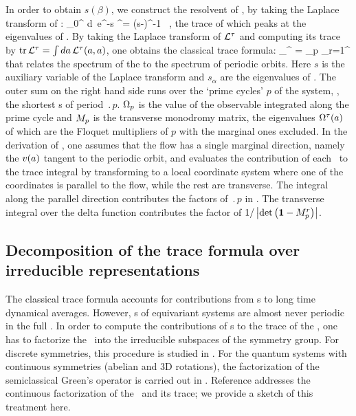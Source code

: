 In order to obtain $s(\beta)$, we construct the resolvent of \Aop , by taking
the Laplace transform of :
\beq
   \int_0^{\infty} \!d\zeit\, e^{-s\zeit} \Lop^\zeit = (s-\Aop)^{-1} \, ,
   \label{eq-ResolventA}
\eeq
the trace of which peaks at the eigenvalues of \Aop. By taking the
Laplace transform of ${\cal L}^{\tau}$ and computing its trace
by $\mbox{\rm tr}\, {\cal L}^{\tau} = \int da \, {\cal L}^{\tau} (a,a)$, one obtains the
classical trace formula:
\beq
\sum_{}^{\infty}  = \sum_p 
\sum_{r=1}^{\infty} 
that relates the spectrum of the {\evOper} to the spectrum of periodic
orbits. Here  $s$ is the auxiliary
variable of the Laplace transform and $s_{\alpha}$ are the eigenvalues of \Aop . The
outer sum on the right hand side runs over the `prime cycles' $p$ of the system,
\ie, the shortest \po s of period $\period{p}$. $\Omega_p$ is the value of
the observable integrated along the prime cycle and ${M}_p$ is the
transverse monodromy matrix, the eigenvalues $\Omega^{\tau} (a)$ of
which are the Floquet multipliers of $p$ with the marginal ones excluded.
In the derivation of , one assumes that
the flow has a single marginal direction, namely the ${v}(a)$ tangent
to the periodic orbit, and evaluates the contribution of each \po\ to the
trace integral by transforming to a local coordinate system where one of
the coordinates is parallel to the flow, while the rest are transverse.
The integral along the parallel direction contributes the factors of
$\period{p}$ in . The transverse integral
over the delta function  contributes the factor of
$1/\left|\mbox{\rm det}\,\!\left({\bf 1}-{M}_p^{r}\right)\right|$.

\subsection{Decomposition of the trace formula over irreducible representations}
\label{s-ContFac}

The classical trace formula  accounts for contributions from \po s
to long time dynamical averages. However, \rpo s of equivariant systems are almost never
periodic in the full \statesp. In order to compute the contributions of \rpo s
to the trace of the \evOper, one has to factorize
the \evOper\
into the irreducible subspaces of the symmetry group. For discrete symmetries,
this procedure is studied in \refref{CvitaEckardt}. For the quantum systems
with continuous symmetries (abelian and 3D rotations), the factorization of
the semiclassical Green's operator is carried out in \refref{Creagh93}.
Reference \cite{Cvi07} addresses the continuous factorization of the \evOper\ and its
trace; we provide a sketch of this treatment here. 


